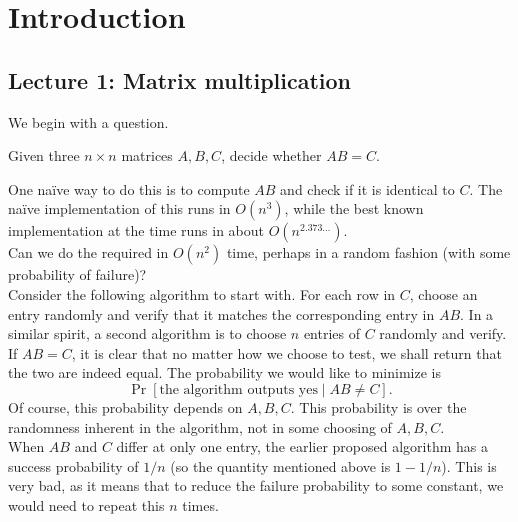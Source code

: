 \section{Introduction}

	\subsection{Lecture 1: Matrix multiplication}

		We begin with a question.

		\begin{problem*}
			Given three $n\times n$ matrices $A,B,C$, decide whether $AB = C$. 
		\end{problem*}

		One na\"{i}ve way to do this is to compute $AB$ and check if it is identical to $C$. The na\"{i}ve implementation of this runs in $O(n^3)$, while the best known implementation at the time runs in about $O(n^{2.373\ldots})$. \\
		Can we do the required in $O(n^2)$ time, perhaps in a random fashion (with some probability of failure)?\\

		Consider the following algorithm to start with. For each row in $C$, choose an entry randomly and verify that it matches the corresponding entry in $AB$. In a similar spirit, a second algorithm is to choose $n$ entries of $C$ randomly and verify.\\

		If $AB = C$, it is clear that no matter how we choose to test, we shall return that the two are indeed equal. The probability we would like to minimize is
		\[ \Pr[\text{the algorithm outputs yes} \mid AB \ne C]. \]
		Of course, this probability depends on $A,B,C$. This probability is over the randomness inherent in the algorithm, not in some choosing of $A,B,C$. \\

		When $AB$ and $C$ differ at only one entry, the earlier proposed algorithm has a success probability of $1/n$ (so the quantity mentioned above is $1-1/n$). This is very bad, as it means that to reduce the failure probability to some constant, we would need to repeat this $n$ times.\\

